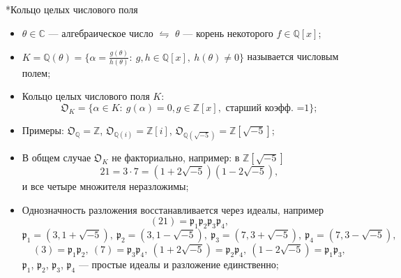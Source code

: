 \documentclass[serif, aspectratio=169]{beamer}
\begin{document}
\begin{frame}{*Кольцо целых числового поля}
    \begin{itemize}
        \item $\theta\in\mathbb{C}$ --- алгебраическое число $\leftrightharpoons$ $\theta$ --- корень некоторого $f\in\mathbb{Q}[x]$;
        \item $K=\mathbb{Q}(\theta)=\{\alpha=\frac{g(\theta)}{h(\theta)}:\ g,h\in\mathbb{Q}[x],\ h(\theta)\ne0\}$ называется числовым полем;
        \item Кольцо целых числового поля $K$:
        \[\mathfrak{O}_K=\{\alpha\in K:\ g(\alpha)=0, g\in\mathbb{Z}[x], \text{ старший коэфф. =1}\};\]
        \item Примеры: $\mathfrak{O}_{\mathbb{Q}}=\mathbb{Z}$, $\mathfrak{O}_{\mathbb{Q}(i)}=\mathbb{Z}[i]$, $\mathfrak{O}_{\mathbb{Q}(\sqrt{-5})}=\mathbb{Z}[\sqrt{-5}]$;
        \item В общем случае $\mathfrak{O}_K$ не факториально, например: в $\mathbb{Z}[\sqrt{-5}]$
        \[21=3\cdot7=(1+2\sqrt{-5})(1-2\sqrt{-5}),\]
        и все четыре множителя неразложимы;
        \item Однозначность разложения восстанавливается через идеалы, например
        \[(21)=\mathfrak{p}_1\mathfrak{p}_2\mathfrak{p}_3\mathfrak{p}_4,\]
        \[\mathfrak{p}_1=(3,1+\sqrt{-5}),\ \mathfrak{p}_2=(3,1-\sqrt{-5}),\ \mathfrak{p}_3=(7,3+\sqrt{-5}),\ \mathfrak{p}_4=(7,3-\sqrt{-5}),\]
        \[(3)=\mathfrak{p}_1\mathfrak{p}_2,\ (7)=\mathfrak{p}_3\mathfrak{p}_4,\ (1+2\sqrt{-5})=\mathfrak{p}_2\mathfrak{p}_4,\ (1-2\sqrt{-5})=\mathfrak{p}_1\mathfrak{p}_3,\]
        $\mathfrak{p}_1$, $\mathfrak{p}_2$, $\mathfrak{p}_3$, $\mathfrak{p}_4$ --- простые идеалы и разложение единственно;
    \end{itemize}

    \note{
        \begin{itemize}
            \item ---
        \end{itemize}
    }
\end{frame}
\end{document}
